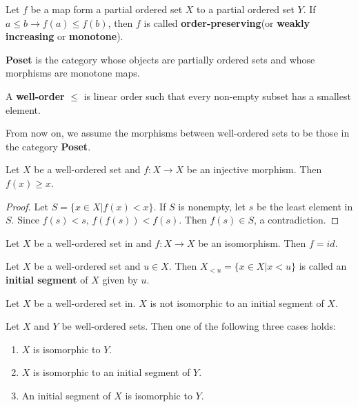 \documentclass[12pt]{book}
\begin{document}
\begin{definition}
	Let $f$ be a map form a partial ordered set $X$ to a partial ordered set $Y$. If $a\leq b\rightarrow f(a)\leq f(b)$, then $f$ is called {\bf order-preserving}(or {\bf weakly increasing} or {\bf monotone}). 
\end{definition}
\begin{definition}
	{\bf Poset} is the category whose objects are partially ordered sets and whose morphisms are monotone maps.
\end{definition}
\begin{definition}
	A {\bf well-order} $\leq$ is linear order such that every non-empty subset has a smallest element.
\end{definition}

From now on, we assume the morphisms between well-ordered sets to be those in the category {\bf Poset}.
\begin{lemma}
	Let $X$ be a well-ordered set and $f: X\rightarrow X$ be an injective morphism. Then $f(x)\geq x$.
\end{lemma}
\begin{proof}
	Let $S=\{x\in X|f(x)<x\}$. If $S$ is nonempty, let $s$ be the least element in $S$. Since $f(s)<s$, $f(f(s))<f(s)$. Then $f(s)\in S$, a contradiction.
\end{proof}
\begin{corollary}
	Let $X$ be a well-ordered set in and $f: X\rightarrow X$ be an isomorphism. Then $f=id$.
\end{corollary}
\begin{definition}
	Let $X$ be a well-ordered set and $u\in X$. Then $X_{<u}=\{x\in X|x<u\}$ is called an {\bf initial segment} of $X$ given by $u$.
\end{definition}
\begin{lemma}
	Let $X$ be a well-ordered set in. $X$ is not isomorphic to an initial segment of $X$.
	\label{lem:order_regular}
\end{lemma}
\begin{theorem}
	Let $X$ and $Y$ be well-ordered sets. Then one of the following three cases holds:
	\begin{enumerate}
		\item $X$ is isomorphic to $Y$.
		\item $X$ is isomorphic to an initial segment of $Y$.
		\item An initial segment of $X$ is isomorphic to $Y$.
	\end{enumerate}
\end{theorem}
\end{document}
